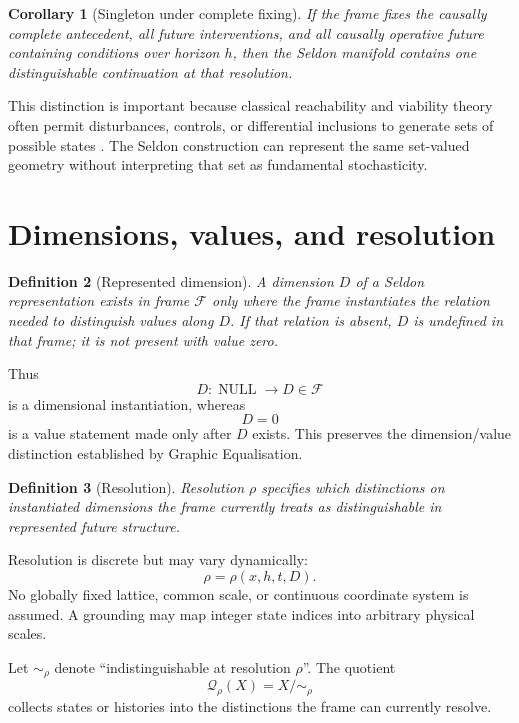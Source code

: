 \documentclass[11pt,a4paper]{article}
\newtheorem{definition}{Definition}[section]
\newtheorem{corollary}[definition]{Corollary}
\theoremstyle{remark}
\newcommand{\Frame}{\mathcal F}
\newcommand{\Qrho}{\mathcal Q_{\rho}}
\begin{document}
\begin{corollary}[Singleton under complete fixing]\label{cor:singleton}
If the frame fixes the causally complete antecedent, all future interventions, and all causally operative future containing conditions over horizon $h$, then the Seldon manifold contains one distinguishable continuation at that resolution.
\end{corollary}

This distinction is important because classical reachability and viability theory often permit disturbances, controls, or differential inclusions to generate sets of possible states \citep{aubin1991,mitchell2005}. The Seldon construction can represent the same set-valued geometry without interpreting that set as fundamental stochasticity.

\section{Dimensions, values, and resolution}\label{sec:dimensions}

\begin{definition}[Represented dimension]\label{def:dimension}
A dimension $D$ of a Seldon representation exists in frame $\Frame$ only where the frame instantiates the relation needed to distinguish values along $D$. If that relation is absent, $D$ is undefined in that frame; it is not present with value zero.
\end{definition}

Thus
\[
D:\operatorname{NULL}\longrightarrow D\in\Frame
\]
is a dimensional instantiation, whereas
\[
D=0
\]
is a value statement made only after $D$ exists. This preserves the dimension/value distinction established by Graphic Equalisation.

\begin{definition}[Resolution]\label{def:resolution}
Resolution $\rho$ specifies which distinctions on instantiated dimensions the frame currently treats as distinguishable in represented future structure.
\end{definition}

Resolution is discrete but may vary dynamically:
\[
\rho=\rho(x,h,t,D).
\]
No globally fixed lattice, common scale, or continuous coordinate system is assumed. A grounding may map integer state indices into arbitrary physical scales.

Let $\sim_{\rho}$ denote ``indistinguishable at resolution $\rho$''. The quotient
\[
\Qrho(X)=X/{\sim_{\rho}}
\]
collects states or histories into the distinctions the frame can currently resolve.
\end{document}
